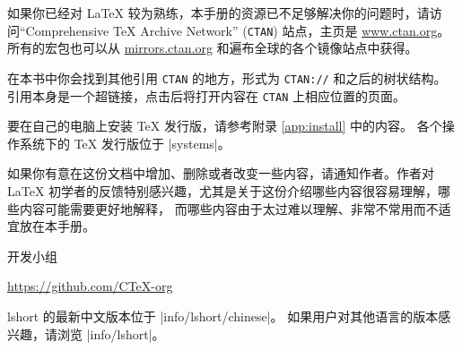 \bigskip
如果你已经对 \LaTeX{} 较为熟练，本手册的资源已不足够解决你的问题时，请访问``Comprehensive
\TeX{} Archive Network'' (\texttt{CTAN}) 站点，主页是 \url{www.ctan.org}。
所有的宏包也可以从 \url{mirrors.ctan.org} 和遍布全球的各个镜像站点中获得。

在本书中你会找到其他引用 \texttt{CTAN} 的地方，形式为 \texttt{CTAN://} 和之后的树状结构。
引用本身是一个超链接，点击后将打开内容在 \texttt{CTAN} 上相应位置的页面。

要在自己的电脑上安装 \TeX{} 发行版，请参考附录 \ref{app:install} 中的内容。
各个操作系统下的 \TeX{} 发行版位于 \CTAN|systems|。

\bigskip
如果你有意在这份文档中增加、删除或者改变一些内容，请通知作者。作者对 \LaTeX{} 
初学者的反馈特别感兴趣，尤其是关于这份介绍哪些内容很容易理解，哪些内容可能需要更好地解释，
而哪些内容由于太过难以理解、非常不常用而不适宜放在本手册。

\bigskip
\begin{flushright}
 开发小组\par
\url{https://github.com/CTeX-org}
\end{flushright}

\vfill

\noindent\begingroup\small lshort 的最新中文版本位于 \CTAN|info/lshort/chinese|。
如果用户对其他语言的版本感兴趣，请浏览 \CTAN|info/lshort|。\endgroup

\endinput
